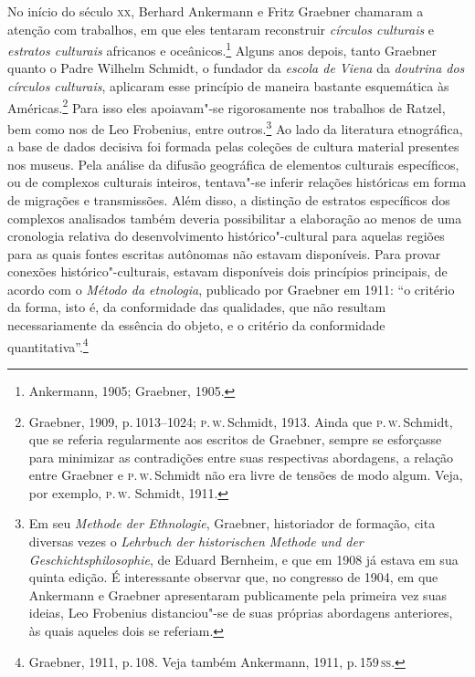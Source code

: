 No início do século \textsc{xx}, Berhard Ankermann e Fritz Graebner
chamaram a atenção com trabalhos, em que eles tentaram
reconstruir \textit{círculos culturais} e \textit{estratos culturais} africanos e
oceânicos.\footnote{Ankermann, 1905; Graebner, 1905.} Alguns anos
depois, tanto Graebner quanto o Padre Wilhelm Schmidt, o
fundador da \textit{escola de Viena} da \textit{doutrina dos círculos culturais},
aplicaram esse princípio de maneira bastante esquemática às
Américas.\footnote{Graebner, 1909, p.\,1013--1024; \textsc{p}.\,\textsc{w}.\,Schmidt, 1913.
  Ainda que \textsc{p}.\,\textsc{w}.\,Schmidt, que se referia regularmente aos escritos de
  Graebner, sempre se esforçasse para minimizar as contradições entre
  suas respectivas abordagens, a relação entre Graebner e \textsc{p}.\,\textsc{w}.\,Schmidt
  não era livre de tensões de modo algum. Veja, por exemplo, \textsc{p}.\,\textsc{w}. Schmidt, 1911.} Para isso eles apoiavam"-se rigorosamente nos trabalhos
de Ratzel, bem como nos de Leo Frobenius, entre
outros.\footnote{Em seu \textit{Methode der Ethnologie}, Graebner, historiador de formação, cita diversas vezes
  o \textit{Lehrbuch der historischen Methode und der
  Geschichtsphilosophie}, de Eduard Bernheim, e que em 1908 já estava em sua quinta
  edição. É interessante observar que, no congresso de 1904, em que
  Ankermann e Graebner apresentaram publicamente pela primeira vez suas
  ideias, Leo Frobenius distanciou"-se de suas próprias abordagens
  anteriores, às quais aqueles dois se referiam.} Ao lado da literatura
etnográfica, a base de dados decisiva foi formada pelas coleções de
cultura material presentes nos museus. Pela análise da difusão
geográfica de elementos culturais específicos, ou de complexos
culturais inteiros, tentava"-se inferir relações históricas em forma de
migrações e transmissões. Além disso, a distinção de estratos
específicos dos complexos analisados também deveria possibilitar a
elaboração ao menos de uma cronologia relativa do desenvolvimento
histórico"-cultural para aquelas regiões para as quais fontes escritas
autônomas não estavam disponíveis. Para provar conexões
histórico"-culturais, estavam disponíveis dois princípios principais, de
acordo com o \textit{Método da etnologia},
publicado por Graebner em 1911: ``o critério da forma, isto é, da
conformidade das qualidades, que não resultam necessariamente da
essência do objeto, e o critério da conformidade quantitativa''.\footnote{Graebner, 1911, p.\,108. Veja também Ankermann, 1911, p.\,159\,\textsc{ss}.}

